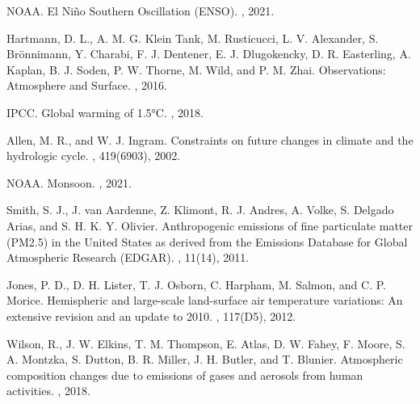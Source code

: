 \documentclass{article}
\begin{document}
\begin{enumerate}
\begin{thebibliography}{10}
NOAA.
\newblock El Niño Southern Oscillation (ENSO).
, 2021.

Hartmann, D. L., A. M. G. Klein Tank, M. Rusticucci, L. V. Alexander, S. Brönnimann, Y. Charabi, F. J. Dentener, E. J. Dlugokencky, D. R. Easterling, A. Kaplan, B. J. Soden, P. W. Thorne, M. Wild, and P. M. Zhai.
\newblock Observations: Atmosphere and Surface.
, 2016.

IPCC.
\newblock Global warming of 1.5°C.
, 2018.

Allen, M. R., and W. J. Ingram.
\newblock Constraints on future changes in climate and the hydrologic cycle.
, 419(6903), 2002.

NOAA.
\newblock Monsoon.
, 2021.

Smith, S. J., J. van Aardenne, Z. Klimont, R. J. Andres, A. Volke, S. Delgado Arias, and S. H. K. Y. Olivier.
\newblock Anthropogenic emissions of fine particulate matter (PM2.5) in the
  United States as derived from the Emissions Database for Global Atmospheric
  Research (EDGAR).
, 11(14), 2011.

Jones, P. D., D. H. Lister, T. J. Osborn, C. Harpham, M. Salmon, and C. P. Morice.
\newblock Hemispheric and large-scale land-surface air temperature variations:
  An extensive revision and an update to 2010.
, 117(D5), 2012.

Wilson, R., J. W. Elkins, T. M. Thompson, E. Atlas, D. W. Fahey, F. Moore, S. A. Montzka, S. Dutton, B. R. Miller, J. H. Butler, and T. Blunier.
\newblock Atmospheric composition changes due to emissions of gases and
  aerosols from human activities.
, 2018.


\end{thebibliography}
\end{enumerate}
\end{document}

